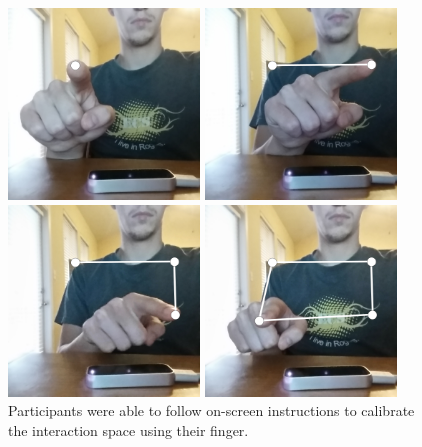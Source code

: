\begin{figure}[!t]
	\centering
	\begin{minipage}[t]{4in}
		\begin{minipage}[t]{1.9in}
			\includegraphics[width=2in]{Figures/fig_calib_1}
		\end{minipage}
		\begin{minipage}[t]{1.9in}
			\includegraphics[width=2in]{Figures/fig_calib_2}
		\end{minipage}
	\end{minipage}
	
	\begin{minipage}[t]{4in}
		\begin{minipage}[t]{1.9in}
			\includegraphics[width=2in]{Figures/fig_calib_3}
		\end{minipage}
		\begin{minipage}[t]{1.9in}
			\includegraphics[width=2in]{Figures/fig_calib_4}
		\end{minipage}
	\end{minipage}
	\caption[Calibration]{Participants were able to follow on-screen instructions to calibrate the interaction space using their finger.}
	\label{calibration_in_progress}
\end{figure}

